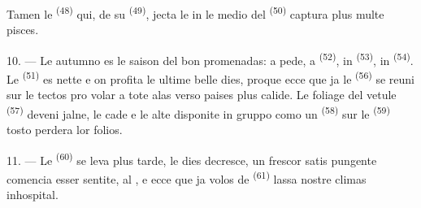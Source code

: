 Tamen le  \textsuperscript{(48)} qui, de su
 \textsuperscript{(49)}, jecta le  in le medio del
 \textsuperscript{(50)} captura plus multe pisces.

10. --- Le autumno es le saison del bon promenadas: a pede, a
 \textsuperscript{(52)}, in 
\textsuperscript{(53)}, in  \textsuperscript{(54)}. Le
 \textsuperscript{(51)} es nette e on profita le ultime belle dies,
proque ecce que ja le  \textsuperscript{(56)} se reuni sur le
tectos pro volar a tote alas verso paises plus calide. Le foliage del vetule
 \textsuperscript{(57)} deveni jalne, le  cade e
le alte  disponite in gruppo como un 
\textsuperscript{(58)} sur le  \textsuperscript{(59)} tosto
perdera lor folios.

11. --- Le  \textsuperscript{(60)} se leva plus tarde, le dies
decresce, un frescor satis pungente comencia esser sentite, al ,
e ecce que ja volos de  \textsuperscript{(61)} lassa nostre
climas inhospital.
\VUsaut{6.0mm}
\VUfilet{22mm}
